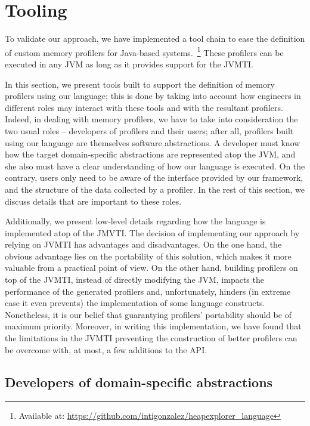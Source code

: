 \section{Tooling}\label{sec:dsl-implementation}

To validate our approach, we have implemented a tool chain to ease the definition of custom memory profilers for Java-based systems.~\footnote{Available at: \url{https://github.com/intigonzalez/heapexplorer\_language}}
These profilers can be executed in any JVM as long as it provides support for the JVMTI.

In this section, we present tools built to support the definition of memory profilers using our language; this is done by taking into account how engineers in different roles may interact with these tools and with the resultant profilers.
Indeed, in dealing with memory profilers, we have to take into consideration the two usual roles -- developers of profilers and their users; after all, profilers built using our language are themselves software abstractions.
A developer must know how the target domain-specific abstractions are represented atop the JVM, and she also must have a clear understanding of how our language is executed.
On the contrary, users only need to be aware of the interface provided by our framework, and the structure of the data collected by a profiler.
In the rest of this section, we discuss details that are important to these roles.

Additionally, we present low-level details regarding how the language is implemented atop of the JMVTI.
The decision of implementing our approach by relying on JVMTI has advantages and disadvantages.
On the one hand, the obvious advantage lies on the portability of this solution, which makes it more valuable from a practical point of view.
On the other hand, building profilers on top of the JVMTI, instead of directly modifying the JVM, impacts the performance of the generated profilers and, unfortunately, hinders (in extreme case it even prevents) the implementation of some language constructs.
Nonetheless, it is our belief that guarantying profilers' portability should be of maximum priority.
Moreover, in writing this implementation, we have found that the limitations in the JVMTI preventing the construction of better profilers can be overcome with, at most, a few additions to the API.


\subsection{Developers of domain-specific abstractions}

